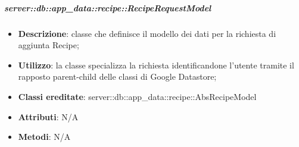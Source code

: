 		\subparagraph{server::db::app\_data::recipe::RecipeRequestModel} %
		\label{subp:server_db_app_data_recipe_reciperequestmodel}
			\begin{itemize}
				\item \textbf{Descrizione}: classe che definisce il modello dei dati per la richiesta di aggiunta Recipe;
				\item \textbf{Utilizzo}: la classe specializza la richiesta identificandone l'utente tramite il rapposto parent-child delle classi di Google Datastore;
				\item \textbf{Classi ereditate}: server::db::app\_data::recipe::AbsRecipeModel
				\item \textbf{Attributi}: N/A
				\item \textbf{Metodi}: N/A
			\end{itemize}


